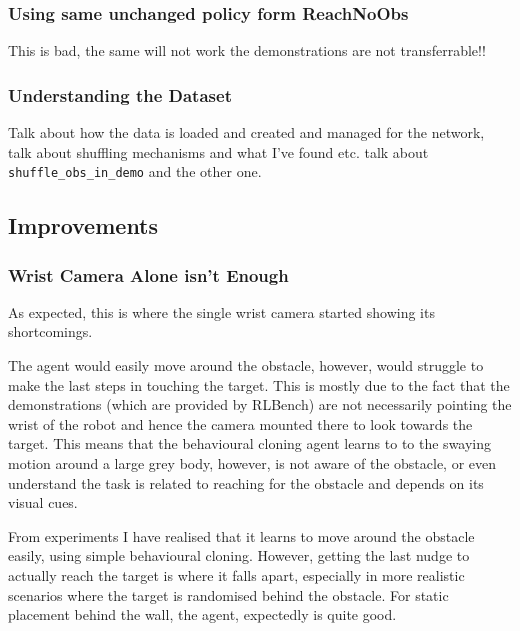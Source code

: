 \subsubsection{Using same unchanged policy form ReachNoObs}
This is bad, the same will not work the demonstrations are not transferrable!!

\subsubsection{Understanding the Dataset}
Talk about how the data is loaded and created and managed for the network, talk about shuffling mechanisms and what I've found etc. talk about \verb|shuffle_obs_in_demo| and the other one.

\subsection{Improvements}



\subsubsection{Wrist Camera Alone isn't Enough}
As expected, this is where the single wrist camera started showing its shortcomings. 


The agent would easily move around the obstacle, however, would struggle to make the last steps in touching the target. This is mostly due to the fact that the demonstrations (which are provided by RLBench) are not necessarily pointing the wrist of the robot and hence the camera mounted there to look towards the target. This means that the behavioural cloning agent learns to to the swaying motion around a large grey body, however, is not aware of the obstacle, or even understand the task is related to reaching for the obstacle and depends on its visual cues. 

From experiments I have realised that it learns to move around the obstacle easily, using simple behavioural cloning. However, getting the last nudge to actually reach the target is where it falls apart, especially in more realistic scenarios where the target is randomised behind the obstacle. For static placement behind the wall, the agent, expectedly is quite good. 

